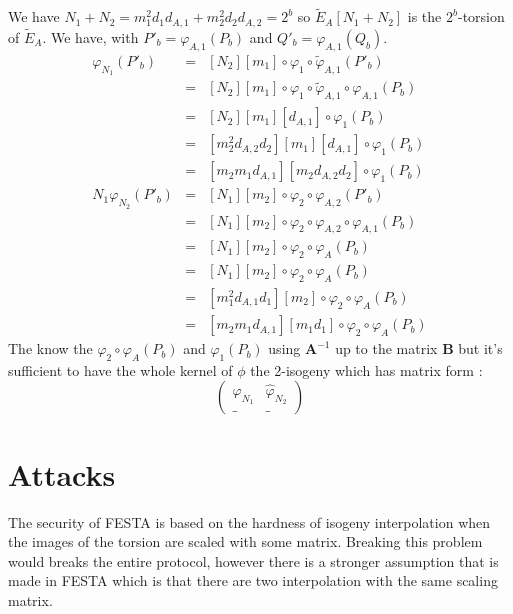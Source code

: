 \documentclass[11pt]{article}
\begin{document}
	We have $N_1 + N_2 = m_1^2d_1d_{A,1} + m_2^2d_2d_{A,2}=2^b$ so $\tilde{E}_A[N_1+N_2]$ is
	the $2^b$-torsion of $\tilde E_A$. We have, with $P'_b=\varphi_{A,1}(P_b)$ and 
	$Q'_b=\varphi_{A,1}(Q_b)$.
	\begin{eqnarray*}
		[N_2]\varphi_{N_1}(P'_b) & = & [N_2][m_1]\circ\varphi_1\circ\tilde\varphi_{A,1}(P'_b) \\
														 & = & [N_2][m_1]\circ\varphi_1\circ\tilde\varphi_{A,1}
														 \circ\varphi_{A,1}(P_b) \\
														 & = & [N_2][m_1][d_{A,1}]\circ\varphi_1(P_b) \\
														 & = & [m_2^2d_{A,2}d_2][m_1][d_{A,1}]\circ\varphi_1(P_b) \\
														 & = & [m_2m_1d_{A,1}][m_2d_{A,2}d_2]\circ\varphi_1(P_b) \\
		N_1\varphi_{N_2}(P'_b) & = & [N_1][m_2]\circ\varphi_2\circ\varphi_{A,2}(P'_b) \\
													 & = & [N_1][m_2]\circ\varphi_2\circ\varphi_{A,2}\circ\varphi_{A,1}(P_b) \\
													 & = & [N_1][m_2]\circ\varphi_2\circ\varphi_A(P_b) \\
													 & = & [N_1][m_2]\circ\varphi_2\circ\varphi_A(P_b) \\
														& = & [m_1^2d_{A,1}d_1][m_2]\circ\varphi_2\circ\varphi_A(P_b) \\
														& = & [m_2m_1d_{A,1}][m_1d_1]\circ\varphi_2\circ\varphi_A(P_b) 
	\end{eqnarray*}
	The know the $\varphi_2\circ\varphi_A(P_b)$ and $\varphi_1(P_b)$ using $\mathbf A^{-1}$
	up to the matrix $\mathbf B$ but
	it's sufficient to have the whole kernel of $\phi$ the 2-isogeny which has matrix form :
	$$\begin{pmatrix}
		 \varphi_{N_1} & \widehat\varphi_{N_2} \\
		 \_ & \_ \end{pmatrix}
	$$

	

	\section{Attacks}
	The security of FESTA is based on the hardness of isogeny interpolation when the
	images of the torsion are scaled with some matrix. Breaking this problem would breaks
	the entire protocol, however there is a stronger assumption that is made in FESTA which
	is that there are two interpolation with the same scaling matrix.
\end{document}
